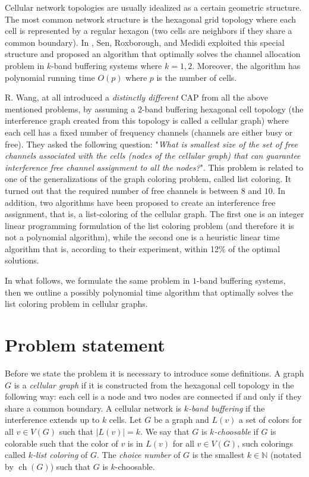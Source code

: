 \documentclass[letterpaper, 10 pt, conference]{ieeeconf}  %
\DeclareMathOperator*{\ch}{ch}
\begin{document}
Cellular network topologies are usually idealized as a certain geometric structure. The most common network structure is the hexagonal grid topology where each cell is represented by a regular hexagon (two cells are neighbors if they share a common boundary). In \cite{662943}, Sen, Roxborough, and Medidi exploited this special structure and proposed an algorithm that optimally solves the channel allocation problem in $k$-band buffering systems where $k=1,2$. Moreover, the algorithm has polynomial running time $O(p)$ where $p$ is the number of cells.

R. Wang, at all \cite{7248845} introduced a \textit{distinctly different} CAP from all the above mentioned problems, by assuming a $2$-band buffering hexagonal cell topology (the interference graph created from this topology is called a cellular graph) where each cell has a fixed number of frequency channels (channels are either busy or free). They asked the following question: "\textit{What is smallest size of the set of free channels associated with the cells (nodes of the cellular graph) that can guarantee interference free channel assignment to all the nodes?}". This problem is related to one of the generalizations of the graph coloring problem, called list coloring. It turned out that the required number of free channels is between $8$ and $10$. In addition, two algorithms have been proposed to create an interference free assignment, that is, a list-coloring of the cellular graph. The first one is an integer linear programming formulation of the list coloring problem (and therefore it is not a polynomial algorithm), while the second one is a heuristic linear time algorithm that is, according to their experiment, within 12\% of the optimal solutions.

In what follows, we formulate the same problem in $1$-band buffering systems, then we outline a possibly polynomial time algorithm that optimally solves the list coloring problem in cellular graphs.

\section{Problem statement}

Before we state the problem it is necessary to introduce some definitions. A graph $G$ is a  \textit{cellular graph} if it is constructed from the hexagonal cell topology in the following way: each cell is a node and two nodes are connected if and only if they share a common boundary.
A cellular network is $k$\textit{-band buffering} if the interference extends up to $k$ cells.
Let $G$ be a graph and $L(v)$ a set of colors for all $v \in V(G)$ such that $|L(v)|=k$. We say that $G$ is $k$\textit{-choosable} if $G$ is colorable such that the color of $v$ is in $L(v)$ for all $v \in V(G)$, such colorings called $k$\textit{-list coloring} of $G$. The \textit{choice number} of $G$ is the smallest $k \in \mathbb{N}$ (notated by $\ch(G)$) such that $G$ is $k$-choosable.
\end{document}
